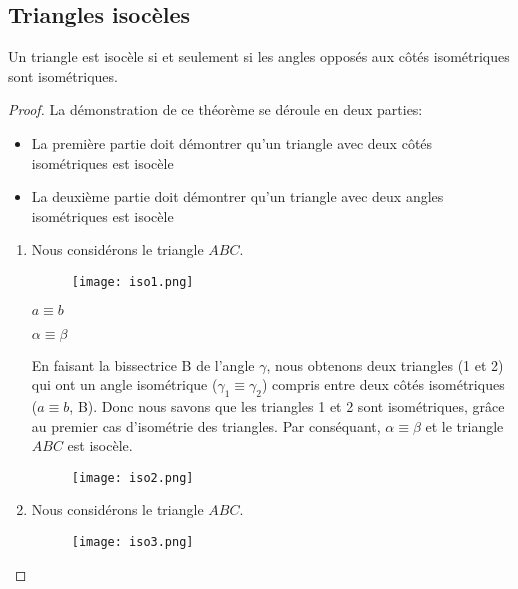 \documentclass[a4paper,12pt]{article}
\begin{document}
\pagebreak
\subsection{Triangles isocèles}
\begin{theorem}
Un triangle est isocèle si et seulement si les angles opposés aux côtés isométriques sont isométriques.
\end{theorem}

\begin{proof}
La démonstration de ce théorème se déroule en deux parties:
\begin{itemize}
    \item La première partie doit démontrer qu'un triangle avec deux côtés isométriques est isocèle
    \item La deuxième partie doit démontrer qu'un triangle avec deux angles isométriques est isocèle
    \end{itemize}

    \begin{enumerate}
        \item Nous considérons le triangle $ABC$.
        \begin{figure}[H]
        \centering
        \texttt{[image: iso1.png]}
    \end{figure}
    
    
    \begin{hyp}
    $a\equiv b$
    \end{hyp}
    \begin{concl}
    $\alpha \equiv \beta$
    \end{concl}
    En faisant la bissectrice B de l'angle $\gamma$, nous obtenons deux triangles (1 et 2) qui ont un angle isométrique ($\gamma_1 \equiv \gamma_2$) compris entre deux côtés isométriques ($a\equiv b$, B). Donc nous savons que les triangles 1 et 2 sont isométriques, grâce au premier cas d'isométrie des triangles. Par conséquant, $\alpha \equiv \beta$ et le triangle $ABC$ est isocèle.
    
    
    \begin{figure}[H]
        \centering
        \texttt{[image: iso2.png]}
    \end{figure}
    
    
    
    
    \item Nous considérons le triangle $ABC$.
    \begin{figure}[H]
            \centering
            \texttt{[image: iso3.png]}
    \end{figure}


\end{enumerate}
\end{proof}
\end{document}
